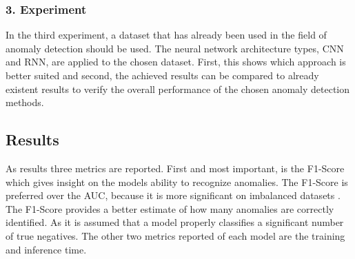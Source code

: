 \subsubsection{3. Experiment}
In the third experiment, a dataset that has already been used in the field of anomaly detection should be used. The neural network architecture types, CNN and RNN, are applied to the chosen dataset. First, this shows which approach is better suited and second, the achieved results can be compared to already existent results to verify the overall performance of the chosen anomaly detection methods.

\subsection{Results}
As results three metrics are reported. First and most important, is the F1-Score which gives insight on the models ability to recognize anomalies. The F1-Score is preferred over the AUC, because it is more significant on imbalanced datasets \parencite{Forman2010}. The F1-Score provides a better estimate of how many anomalies are correctly identified. As it is assumed that a model properly classifies a significant number of true negatives. The other two metrics reported of each model are the training and inference time.



 